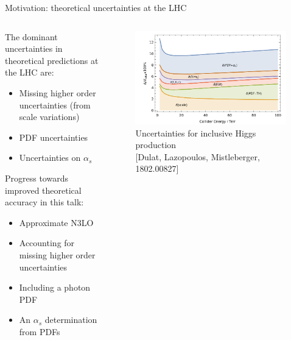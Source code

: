 \documentclass[8pt,t]{beamer}
\begin{document}
\begin{frame}{Motivation: theoretical uncertainties at the LHC}

  \begin{columns}
    \begin{column}{0.55\textwidth}
      The dominant uncertainties in theoretical predictions at the LHC are:
      \begin{itemize}
        \item Missing higher order uncertainties (from scale variations)
        \item PDF uncertainties
        \item Uncertainties on $\alpha_s$
      \end{itemize}

      \vspace*{0.5em}
      Progress towards improved theoretical accuracy in this talk:
      \begin{itemize}
        \item Approximate N3LO
        \item Accounting for missing higher order uncertainties
        \item Including a photon PDF
        \item An $\alpha_s$ determination from PDFs
      \end{itemize}
    \end{column}
    \begin{column}{0.44\textwidth}
      \begin{figure}
        \centering
        \includegraphics[width=0.99\textwidth]{figures/sources_of_unc_higgs.png}
        \caption*{ \small Uncertainties for inclusive Higgs production \\  {\color{gray}\footnotesize [Dulat, Lazopoulos, Mistleberger, 1802.00827]}}
      \end{figure}


\end{column}
\end{columns}
\end{frame}
\end{document}
